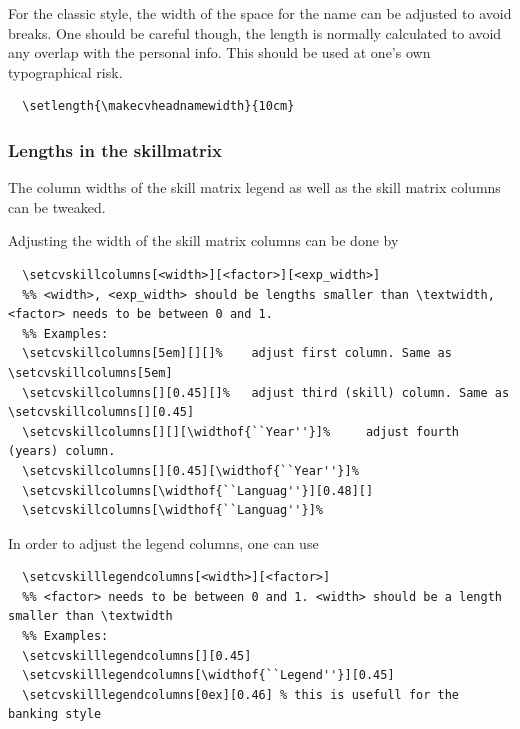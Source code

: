 \documentclass[a4paper,11pt]{article}
\newcommand{\Code}[1]{\lstinline!#1!~} %
\begin{document}
For the classic style, the width of the space for the name can be adjusted to avoid breaks.
One should be careful though, the length is normally calculated to avoid any overlap with the personal info. This should be used at one's own typographical risk.
\begin{lstlisting}
  \setlength{\makecvheadnamewidth}{10cm}
\end{lstlisting}



\subsubsection{Lengths in the skillmatrix}
\label{section:length:skillmatrix}
The column widths of the skill matrix legend as well as the skill matrix columns can be tweaked.

Adjusting the width of the skill matrix columns can be done by
\begin{lstlisting}
  \setcvskillcolumns[<width>][<factor>][<exp_width>]
  %% <width>, <exp_width> should be lengths smaller than \textwidth, <factor> needs to be between 0 and 1.
  %% Examples:
  \setcvskillcolumns[5em][][]%    adjust first column. Same as \setcvskillcolumns[5em]
  \setcvskillcolumns[][0.45][]%   adjust third (skill) column. Same as \setcvskillcolumns[][0.45]
  \setcvskillcolumns[][][\widthof{``Year''}]%     adjust fourth (years) column.
  \setcvskillcolumns[][0.45][\widthof{``Year''}]%
  \setcvskillcolumns[\widthof{``Languag''}][0.48][]
  \setcvskillcolumns[\widthof{``Languag''}]%
\end{lstlisting}

In order to adjust the legend columns, one can use
\begin{lstlisting}
  \setcvskilllegendcolumns[<width>][<factor>]
  %% <factor> needs to be between 0 and 1. <width> should be a length smaller than \textwidth
  %% Examples:
  \setcvskilllegendcolumns[][0.45]
  \setcvskilllegendcolumns[\widthof{``Legend''}][0.45]
  \setcvskilllegendcolumns[0ex][0.46] % this is usefull for the banking style
\end{lstlisting}
\end{document}
